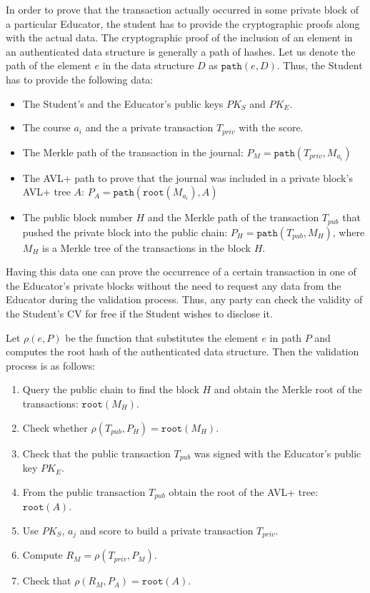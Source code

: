 In order to prove that the transaction actually occurred in some private block of a particular Educator, the student has to provide the cryptographic proofs along with the actual data. The cryptographic proof of the inclusion of an element in an authenticated data structure is generally a path of hashes. Let us denote the path of the element $e$ in the data structure $D$ as $\mathtt{path}(e, D)$. Thus, the Student has to  provide the following data:
\begin{itemize}
  \item The Student's and the Educator's public keys $PK_S$ and $PK_E$.
  \item The course $a_i$ and the a private transaction $T_{priv}$ with the score.
  \item The Merkle path of the transaction in the journal: $P_{M} = \mathtt{path}(T_{priv}, M_{a_i})$
  \item The AVL+ path to prove that the journal was included in a private block's AVL+ tree $A$: $P_{A} = \mathtt{path}(\mathtt{root}(M_{a_i}), A)$
  \item The public block number $H$ and the Merkle path of the transaction $T_{pub}$ that pushed the private block into the public chain: $P_{H} = \mathtt{path}(T_{pub}, M_H)$, where $M_H$ is a Merkle tree of the transactions in the block $H$.
\end{itemize}

Having this data one can prove the occurrence of a certain transaction in one of the Educator's private blocks without the need to request any data from the Educator during the validation process. Thus, any party can check the validity of the Student's CV for free if the Student wishes to disclose it.

Let $\rho(e, P)$ be the function that substitutes the element $e$ in path $P$ and computes the root hash of the authenticated data structure. Then the validation process is as follows:
\begin{enumerate}
\item Query the public chain to find the block $H$ and obtain the Merkle root of the transactions: $\mathtt{root}(M_H)$.
\item Check whether $\rho(T_{pub}, P_{H}) = \mathtt{root}(M_H)$.
\item Check that the public transaction $T_{pub}$ was signed with the Educator's public key $PK_E$.
\item From the public transaction $T_{pub}$ obtain the root of the AVL+ tree: $\mathtt{root}(A)$.
\item Use $PK_S$, $a_j$ and score to build a private transaction $T_{priv}$.
\item Compute $R_{M} = \rho(T_{priv}, P_{M})$.
\item Check that $\rho(R_{M}, P_{A}) = \mathtt{root}(A)$.
\end{enumerate}

